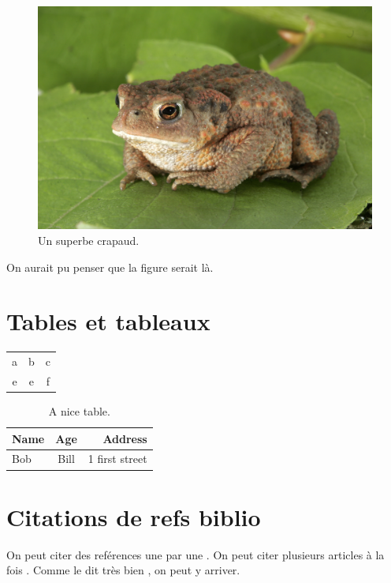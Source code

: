 \documentclass[10pt,a4paper,twoside]{article}
\begin{document}
\blindtext[2]

\begin{figure}[htbp]
    \begin{center}
        \includegraphics[width=1.\textwidth]{figures/toad.jpg}
    \end{center}
    \caption{Un superbe crapaud.}
    \label{fig:toad}
\end{figure}

On aurait pu penser que la figure serait là.
\blindtext[2]

\section{Tables et tableaux}

\begin{tabular}{ccc}
    a & b & c \\
    e & e & f
\end{tabular}

\begin{table}[]
    \caption{A nice table.}
    \label{tab:nice_table}
    \begin{center}
        \begin{tabular}{@{}lcr@{}}
            \toprule
            Name & Age & Address \\
            \midrule
            Bob & Bill  & 1 first street \\
            \bottomrule
        \end{tabular}
    \end{center}
    
\end{table}


\section{Citations de refs biblio}

On peut citer des reférences une par une \citep{hawking1974black}. 
On peut citer plusieurs articles à la fois \citep{belczynski2012missing,hawking1974black}.
Comme le dit très bien \citeauthor{belczynski2012missing}, on peut y arriver.


%

\end{document}
